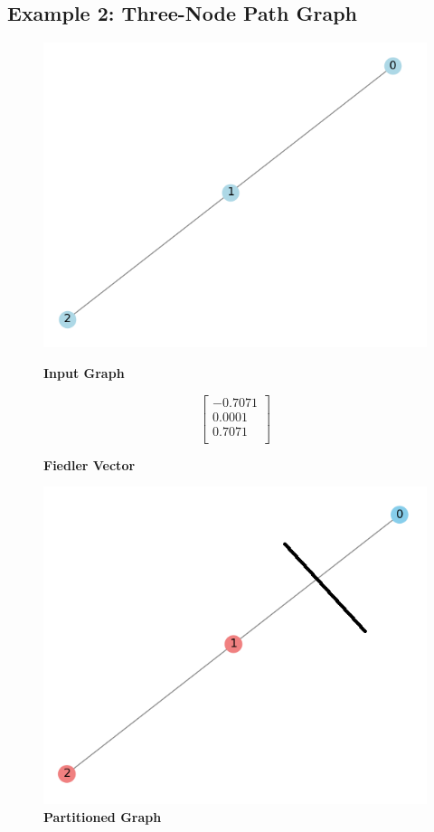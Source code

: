 \documentclass[hidelinks,12pt]{article}
\begin{document}
\subsection{Example 2: Three-Node Path Graph}
\begin{figure}[h!]
\centering
\begin{minipage}[c]{0.33\textwidth}
    \centering
    \includegraphics[width=\linewidth]{figures/image03.png}
    \caption*{\textbf{Input Graph}}
\end{minipage}%
\hfill
\begin{minipage}[c]{0.28\textwidth}
    \centering
    \[
    \begin{bmatrix}
    -0.7071 \\
    0.0001 \\
    0.7071 \\
    \end{bmatrix}
    \]
    \caption*{\textbf{Fiedler Vector}}
\end{minipage}%
\hfill
\begin{minipage}[c]{0.33\textwidth}
    \centering
    \includegraphics[width=\linewidth]{figures/image04.png}
    \caption*{\textbf{Partitioned Graph}}
\end{minipage}
\end{figure}
\end{document}
